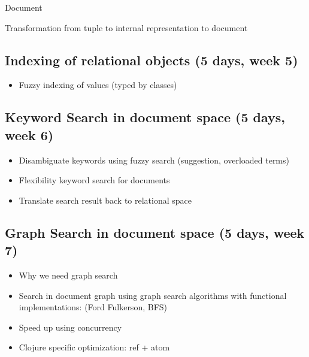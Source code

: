 \begin{table}
\begin{subtable}[b]{0.33\linewidth}
					\caption{Document}
				\end{subtable}
				
				\caption{Transformation from tuple to internal representation to document}
				\label{tbl:tuple-to-document}
			\end{table}
			
	\subsection{Indexing of relational objects (5 days, week 5)}
		\begin{itemize}
			\item Fuzzy indexing of values (typed by classes)
		\end{itemize}

	\subsection{Keyword Search in document space (5 days, week 6)}
		\begin{itemize}
			\item Disambiguate keywords using fuzzy search (suggestion, overloaded terms)
			\item Flexibility keyword search for documents
			\item Translate search result back to relational space
		\end{itemize}

	\subsection{Graph Search in document space (5 days, week 7)}
		\begin{itemize}
			\item Why we need graph search
			\item Search in document graph using graph search algorithms with functional implementations: (Ford Fulkerson, BFS)
			\item Speed up using concurrency
			\item Clojure specific optimization: ref + atom
		\end{itemize}